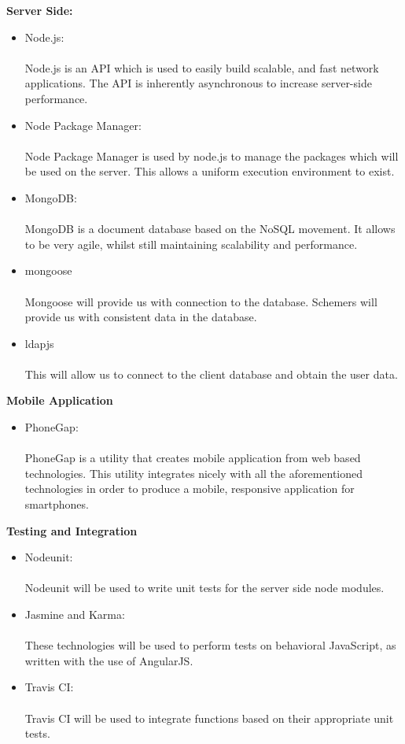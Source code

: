 {\bfseries Server Side:}
\begin{itemize}
	\item Node.js:\\ \\ 
	Node.js is an API which is used to easily build scalable, and fast network applications. The API is inherently asynchronous to increase server-side performance.
	\item Node Package Manager:\\ \\
	Node Package Manager is used by node.js to manage the packages which will be used on the server. This allows a uniform execution environment to exist.
	\item MongoDB: \\ \\
	MongoDB is a document database based on the NoSQL movement. It allows to be very agile, whilst still maintaining scalability and performance.
	\item mongoose \\ \\
	Mongoose will provide us with connection to the database. Schemers will provide us with consistent data in the database.
	\item ldapjs \\ \\
	This will allow us to connect to the client database and obtain the user data.
\end{itemize}
{\bfseries Mobile Application}
\begin{itemize}
	\item PhoneGap:\\ \\
	PhoneGap is a utility that creates mobile application from web based technologies. This utility integrates nicely with all the aforementioned technologies in order to produce a mobile, responsive application for smartphones.
\end{itemize}
{\bfseries Testing and Integration}
\begin{itemize}
	\item Nodeunit:\\ \\
	Nodeunit will be used to write unit tests for the server side node modules.
	\item Jasmine and Karma:\\ \\
	These technologies will be used to perform tests on behavioral JavaScript, as written with the use of AngularJS.
	\item Travis CI:\\ \\
	Travis CI will be used to integrate functions based on their appropriate unit tests.
\end{itemize}